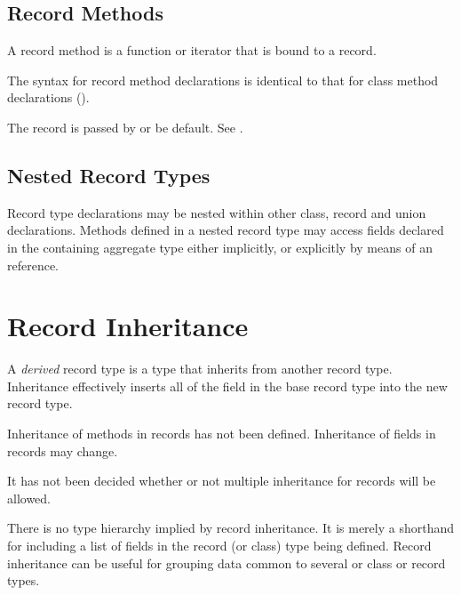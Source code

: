 \subsection{Record Methods}
\label{Record_Methods}

A record method is a function or iterator that is bound to a record.

The syntax for record method declarations is identical to that for class method
declarations ().

The record is passed by  or  be default. See
.

\subsection{Nested Record Types}
\label{Nested_Record_Types}

Record type declarations may be nested within other class, record and union
declarations.  Methods defined in a nested record type may access fields
declared in the containing aggregate type either implicitly, or explicitly by
means of an  reference.

\section{Record Inheritance}
\label{Record_Inheritance}

A \emph{derived} record type is a type that inherits from another record
type. Inheritance effectively inserts
all of the field in the base record type into the new record type.

\begin{openissue}
Inheritance of methods in records has not been defined. Inheritance of
fields in records may change.
\end{openissue}

\begin{openissue}
It has not been decided whether or not multiple inheritance for records
will be allowed.
\end{openissue}

There is no type hierarchy implied
by record inheritance.  It is merely a shorthand for including a list of fields
in the record (or class) type being defined.  Record inheritance can be useful
for grouping data common to several or class or record types.

